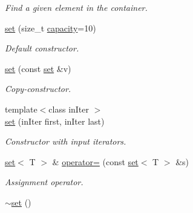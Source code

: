 \begin{DoxyCompactItemize}
\begin{DoxyCompactList}\small\item\em Find a given element in the container. \end{DoxyCompactList}\item 
\hyperlink{classmerlin_1_1set_a435150b8aca2440576d6d2d11cb17e22}{set} (size\+\_\+t \hyperlink{classmerlin_1_1set_ad3f6a7acc4c9bf242f7f7232e50327bc}{capacity}=10)\hypertarget{classmerlin_1_1set_a435150b8aca2440576d6d2d11cb17e22}{}\label{classmerlin_1_1set_a435150b8aca2440576d6d2d11cb17e22}

\begin{DoxyCompactList}\small\item\em Default constructor. \end{DoxyCompactList}\item 
\hyperlink{classmerlin_1_1set_afcc09e984c6dad4310b4dd1e53df02f0}{set} (const \hyperlink{classmerlin_1_1set}{set} \&v)\hypertarget{classmerlin_1_1set_afcc09e984c6dad4310b4dd1e53df02f0}{}\label{classmerlin_1_1set_afcc09e984c6dad4310b4dd1e53df02f0}

\begin{DoxyCompactList}\small\item\em Copy-\/constructor. \end{DoxyCompactList}\item 
{\footnotesize template$<$class in\+Iter $>$ }\\\hyperlink{classmerlin_1_1set_aa945e76777e7d527be7487072029f359}{set} (in\+Iter first, in\+Iter last)\hypertarget{classmerlin_1_1set_aa945e76777e7d527be7487072029f359}{}\label{classmerlin_1_1set_aa945e76777e7d527be7487072029f359}

\begin{DoxyCompactList}\small\item\em Constructor with input iterators. \end{DoxyCompactList}\item 
\hyperlink{classmerlin_1_1set}{set}$<$ T $>$ \& \hyperlink{classmerlin_1_1set_ab44b00506d4ba9a6209bba0dc2df7df7}{operator=} (const \hyperlink{classmerlin_1_1set}{set}$<$ T $>$ \&s)\hypertarget{classmerlin_1_1set_ab44b00506d4ba9a6209bba0dc2df7df7}{}\label{classmerlin_1_1set_ab44b00506d4ba9a6209bba0dc2df7df7}

\begin{DoxyCompactList}\small\item\em Assignment operator. \end{DoxyCompactList}\item 
\hyperlink{classmerlin_1_1set_a96d2340e84d377b1a9a8b62123e9a7c1}{$\sim$set} ()\hypertarget{classmerlin_1_1set_a96d2340e84d377b1a9a8b62123e9a7c1}{}\label{classmerlin_1_1set_a96d2340e84d377b1a9a8b62123e9a7c1}


\end{DoxyCompactItemize}
